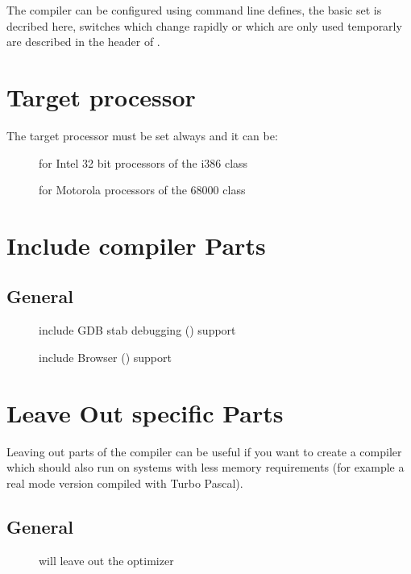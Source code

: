 \documentclass{report}
\begin{document}
The compiler can be configured using command line defines, the
basic set is decribed here, switches which change rapidly or
which are only used temporarly are described in the header
of .

\section{Target processor}

The target processor must be set always and it can be:

\begin{description}
\item [] for Intel 32 bit processors of the i386 class
\item [] for Motorola processors of the 68000 class
\end{description}

\section{Include compiler Parts}

\subsection{General}
\begin{description}
 \item[] include GDB stab debugging () support
 \item[] include Browser () support
\end{description}

\section{Leave Out specific Parts}

Leaving out parts of the compiler can be useful if you want to create
a compiler which should also run on systems with less memory
requirements (for example a real mode version compiled with Turbo Pascal).

\subsection{General}
\begin{description}
 \item[] will leave out the optimizer
\end{description}
\end{document}
